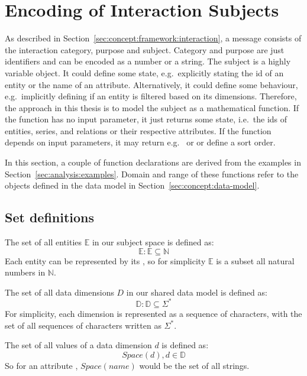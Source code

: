 \section{Encoding of Interaction Subjects}\label{sec:concept:message-interface}

As described in Section~\ref{sec:concept:framework:interaction}, a message consists of the interaction category, purpose and subject.
Category and purpose are just identifiers and can be encoded as a number or a string.
The subject is a highly variable object.
It could define some state, e.g.\ explicitly stating the id of an entity or the name of an attribute.
Alternatively, it could define some behaviour, e.g.\ implicitly defining if an entity is filtered based on its dimensions.
Therefore, the approach in this thesis is to model the subject as a mathematical function.
If the function has no input parameter, it just returns some state, i.e.\ the ids of entities, series, and relations or their respective attributes.
If the function depends on input parameters, it may return e.g.\  or  or define a sort order.

In this section, a couple of function declarations are derived from the examples in Section~\ref{sec:analysis:examples}.
Domain and range of these functions refer to the objects defined in the data model in Section~\ref{sec:concept:data-model}.

\subsection{Set definitions}
The set of all entities $\mathbb{E}$ in our subject space is defined as:
\begin{equation} \mathbb{E} : \mathbb{E} \subseteq \mathbb{N}  \end{equation}
Each entity can be represented by its , so for simplicity $\mathbb{E}$ is a subset all natural numbers in $\mathbb{N}$.

The set of all data dimensions $D$ in our shared data model is defined as:
\begin{equation} \mathbb{D} : \mathbb{D} \subseteq \Sigma^* \end{equation}
For simplicity, each dimension is represented as a sequence of characters, with the set of all sequences of characters written as $ \Sigma^*$.

The set of all values of a data dimension $d$ is defined as:
\begin{equation} Space(d), d \in \mathbb{D} \end{equation}
So for an attribute , $Space(name)$ would be the set of all strings.

